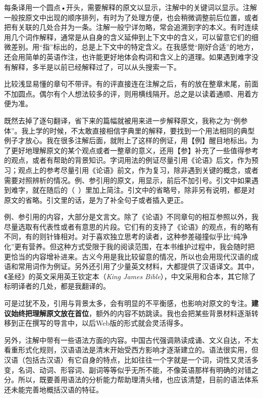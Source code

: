 每条译用一个圆点•开头，需要解释的原文以显示，注解中的关键词以显示。注解一般按原文中出现的顺序排列，有时为了处理方便，也会稍微调整前后位置，或者把有关联的几处合并为一条。注解一般宁详勿略，常会追溯到字的本义。有时连续用几个词作解释，通常是从自身的含义延伸到上下文中的含义，可以留意它们的细微差别。用“指”标出的，总是上下文中的特定含义。在我感觉“刚好合适”的地方，还会用简单的英语作注，也许能更好地体会构词和含义上的道理。如果遇到难字没有解释，多半是以前已经解释过了，可以从头搜索一下。

比较浅显易懂的章句不带评。有的评直接连在注解之后，有的放在整章末尾，前面不加圆点。偶尔有个人想法较多的评，则用横线隔开。总之是以读着通顺、用着方便为准。

既然去掉了逐句翻译，省下来的篇幅就被用来进一步解释原文，我称之为“例参体”。我上学的时候，不太敢直接相信字典里的解释，要找到一个用法相同的典型例子才放心。我在很多注解后面，就附上了这样的例证，用【例】醒目地标出。为了更好地理解原文的某个观点或者一整章的意义，还用【参】补充了一些值得参考的观点，或者有帮助的背景知识。字词用法的例证尽量引用《论语》后文，作为预习；观点上的参考尽量引用《论语》前文，作为复习，除非遇到关键的概念，或者需要对照辨析的情况。例、参引用的原文，用显示，前后不加引号。引文中如果遇到难字，就在随后的（~）里加上简注。引文中的省略号，除非另有说明，都是对原文的省略。引文里的话，是为了补全句子或者插入更正。

例、参引用的内容，大部分是文言文。除了《论语》不同章句的相互参照以外，我尽量选取有代表性或者有意思的片段。它们有的支持了《论语》的观点，有的略有不同，有的则针锋相对。对于喜欢独立思考的读者，这种参差碰撞似乎比“纯净化”更有营养。但这种方式受限于我的阅读范围，在本书维护过程中，我会随时把更恰当的内容增补进来。古义今用是我比较留意的情况，所以也会用现代汉语的成语和常用词作为例证。另外还引用了少量英文材料，大都提供了汉语译文。其中，《圣经》的英文采用英王钦定本（\emph{King James Bible}），中文采用和合本，其它除了标明译者的几处，都是我翻译的。

可是过犹不及，引用与背景太多，会有明显的不平衡感，也影响对原文的专注。\textbf{建议始终把理解原文放在首位}，额外的内容不妨跳读。我也会把某些背景材料逐渐转移到正在撰写的导言中，以后Web版的形式就会灵活得多。

另外，注解中带有一些语法方面的内容。中国古代强调熟读成诵、文义自达，不太看重形式化规则，汉语语法是清末开始受西方影响才逐渐建立的。语法很实用，但汉语（包括古汉语）有它自身的特点，比如往往一个字就是一个词，词性又灵活多变，名词、动词、形容词、副词等等似乎无所不能，不像英语那样有明确的对错之分。所以，既要善用语法的分析能力帮助理清头绪，也应该清楚，目前的语法体系还未能完善地概括汉语的特征。

